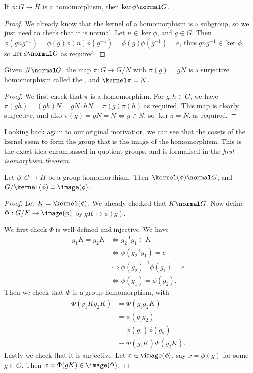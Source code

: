 \begin{theorem}
	If $\phi: G \rightarrow H$ is a homomorphism, then $\ker \phi \normal G$.
\end{theorem}
\begin{proof}
	We already know that the kernel of a homomorphism is a subgroup, so we just need to check that it is normal. Let $n \in \ker \phi$, and $g \in G$. Then $\phi(gng^{-1}) = \phi(g) \phi(n)\phi(g^{-1}) = \phi(g) \phi(g^{-1}) = e$, thus $gng^{-1} \in \ker \phi$, so $\ker \phi \normal G$ as required.
\end{proof}

\begin{theorem}
	Given $N \normal G$, the map $\pi: G \rightarrow G/N$ with $\pi(g) = gN$ is a surjective homomorphism called the , and $\kernel \pi = N$.
\end{theorem}
\begin{proof}
We first check that $\pi$ is a homomorphism. For $g, h \in G$, we have $\pi(gh) = (gh)N = gN \cdot hN = \pi(g) \pi(h)$ as required. This map is clearly surjective, and also $\pi(g) = gN = N \iff g \in N$, so $\ker \pi = N$, as required.
\end{proof}


Looking back again to our original motivation, we can see that the cosets of the kernel seem to form the group that is the image of the homomorphism. This is the exact idea encompassed in quotient groups, and is formalised in the \emph{first isomorphism theorem}.

\begin{theorem}
	Let $\phi: G \rightarrow H$ be a group homomorphism. Then $\kernel(\phi) \normal G$, and $G/\kernel(\phi) \cong \image(\phi)$.
\end{theorem}
\begin{proof}
	Let $K = \kernel(\phi)$. We already checked that $K \normal G$. Now define $\Phi: G/K \rightarrow \image(\phi)$ by $gK \mapsto \phi(g)$.

	We first check $\Phi$ is well defined and injective. We have
	\begin{align*}
		g_1K = g_2K &\iff g_2^{-1} g_1 \in K \\
		&\iff \phi(g_2^{-1}g_1) = e \\
		&\iff \phi(g_2)^{-1} \phi(g_1) = e  \\
		&\iff \phi(g_1) = \phi(g_2).
	\end{align*}
	Then we check that $\Phi$ is a group homomorphism, with
	\begin{align*}
		\Phi(g_1 K g_2 K) &= \Phi(g_1 g_2 K) \\
			&= \phi(g_1 g_2) \\
			&= \phi(g_1) \phi(g_2) \\
			&= \Phi(g_1 K) \Phi(g_2 K).
	\end{align*}
	Lastly we check that it is surjective. Let $x \in \image(\phi)$, say $x = \phi(g)$ for some $g \in G$. Then $x = \Phi(gK) \in \image(\Phi)$.
\end{proof}

